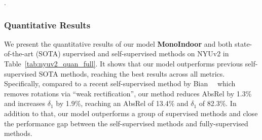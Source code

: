 \begin{table*}[!t]
    \caption{Comparison of our method to latest self-supervised methods on RGB-D 7-Scenes~\cite{Shotton_2013_CVPR}. Best results are in \textbf{bold}}.
    \label{tab:7scenes_quan_full}
    \centering
\end{table*}

\subsubsection{Quantitative Results}

We present the quantitative results of our model \textbf{MonoIndoor} and both state-of-the-art (SOTA) supervised and self-supervised methods on NYUv2 in Table~\ref{tab:nyuv2_quan_full}. It shows that our model outperforms previous self-supervised SOTA methods, reaching the best results across all metrics. Specifically, compared to a recent self-supervised method by Bian~\etal~\cite{bian2020unsupervised} which removes rotations via ``weak rectification'', our method reduces AbsRel by 1.3\% and increases $\delta_1$ by 1.9\%, reaching an AbsRel of 13.4\%  and $\delta_1$ of 82.3\%.  In addition to that, our model outperforms a group of supervised methods and close the performance gap between the self-supervised methods and fully-supervised methods. 

